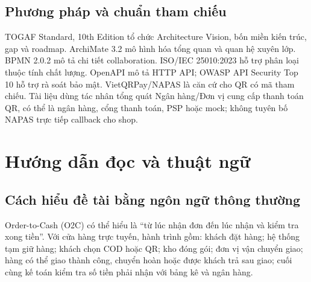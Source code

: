 \documentclass[12pt,a4paper]{report}
\begin{document}
\section{Phương pháp và chuẩn tham chiếu}
TOGAF Standard, 10th Edition tổ chức Architecture Vision, bốn miền kiến trúc, gap và roadmap. ArchiMate 3.2 mô hình hóa tổng quan và quan hệ xuyên lớp. BPMN 2.0.2 mô tả chi tiết collaboration. ISO/IEC 25010:2023 hỗ trợ phân loại thuộc tính chất lượng. OpenAPI mô tả HTTP API; OWASP API Security Top 10 hỗ trợ rà soát bảo mật. VietQRPay/NAPAS là căn cứ cho QR có mã tham chiếu. Tài liệu dùng tác nhân tổng quát Ngân hàng/Đơn vị cung cấp thanh toán QR, có thể là ngân hàng, cổng thanh toán, PSP hoặc mock; không tuyên bố NAPAS trực tiếp callback cho shop.

\chapter{Hướng dẫn đọc và thuật ngữ}

\section{Cách hiểu đề tài bằng ngôn ngữ thông thường}
Order-to-Cash (O2C) có thể hiểu là ``từ lúc nhận đơn đến lúc nhận và kiểm tra xong tiền''. Với cửa hàng trực tuyến, hành trình gồm: khách đặt hàng; hệ thống tạm giữ hàng; khách chọn COD hoặc QR; kho đóng gói; đơn vị vận chuyển giao; hàng có thể giao thành công, chuyển hoàn hoặc được khách trả sau giao; cuối cùng kế toán kiểm tra số tiền phải nhận với bảng kê và ngân hàng.
\end{document}
